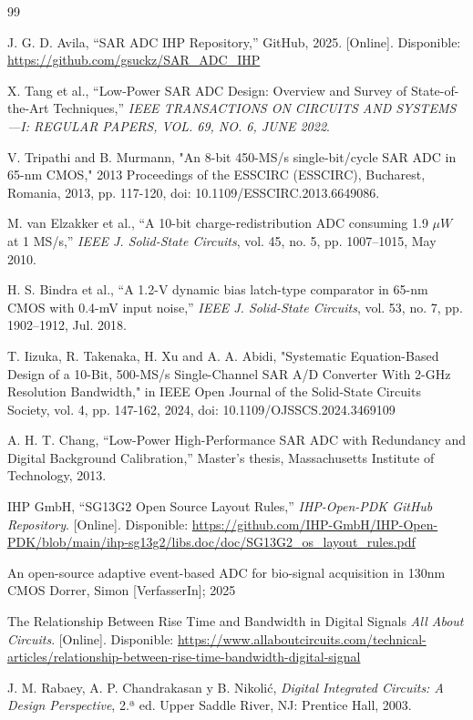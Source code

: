 \documentclass[12pt,a4paper]{report}
\begin{document}
\begin{thebibliography}{99}

J. G. D. Avila, ``SAR ADC IHP Repository,'' GitHub, 2025. [Online]. Disponible: \url{https://github.com/gsuckz/SAR_ADC_IHP}

 X. Tang et al., ``Low-Power SAR ADC Design: Overview and Survey of State-of-the-Art Techniques,'' \textit{IEEE TRANSACTIONS ON CIRCUITS AND SYSTEMS—I: REGULAR PAPERS, VOL. 69, NO. 6, JUNE 2022}.

 V. Tripathi and B. Murmann, "An 8-bit 450-MS/s single-bit/cycle SAR ADC in 65-nm CMOS," 2013 Proceedings of the ESSCIRC (ESSCIRC), Bucharest, Romania, 2013, pp. 117-120, doi: 10.1109/ESSCIRC.2013.6649086.

 M. van Elzakker et al., ``A 10-bit charge-redistribution ADC consuming 1.9 $\mu W$ at 1 MS/s,'' \textit{IEEE J. Solid-State Circuits}, vol. 45, no. 5, pp. 1007–1015, May 2010.

 H. S. Bindra et al., ``A 1.2-V dynamic bias latch-type comparator in 65-nm CMOS with 0.4-mV input noise,'' \textit{IEEE J. Solid-State Circuits}, vol. 53, no. 7, pp. 1902–1912, Jul. 2018.

 T. Iizuka, R. Takenaka, H. Xu and A. A. Abidi, "Systematic Equation-Based Design of a 10-Bit, 500-MS/s Single-Channel SAR A/D Converter With 2-GHz Resolution Bandwidth," in IEEE Open Journal of the Solid-State Circuits Society, vol. 4, pp. 147-162, 2024, doi: 10.1109/OJSSCS.2024.3469109

 A. H. T. Chang, ``Low-Power High-Performance SAR ADC with Redundancy and Digital Background Calibration,'' Master's thesis, Massachusetts Institute of Technology, 2013.

IHP GmbH, ``SG13G2 Open Source Layout Rules,'' \textit{IHP-Open-PDK GitHub Repository}. [Online]. Disponible: \url{https://github.com/IHP-GmbH/IHP-Open-PDK/blob/main/ihp-sg13g2/libs.doc/doc/SG13G2_os_layout_rules.pdf}

	
 An open-source adaptive event-based ADC for bio-signal acquisition in 130nm CMOS
Dorrer, Simon [VerfasserIn]; 2025

The Relationship Between Rise Time and Bandwidth in Digital Signals \textit{All About Circuits}. [Online]. Disponible: \url{https://www.allaboutcircuits.com/technical-articles/relationship-between-rise-time-bandwidth-digital-signal}

J. M. Rabaey, A. P. Chandrakasan y B. Nikolić, \textit{Digital Integrated Circuits: A Design Perspective}, 2.ª ed. Upper Saddle River, NJ: Prentice Hall, 2003.

\end{thebibliography}

\end{document}
